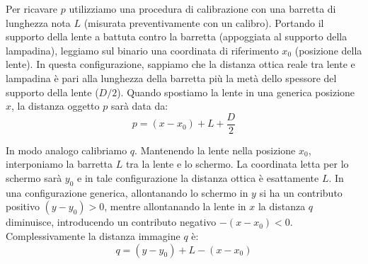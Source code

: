 \documentclass[openany,a4paper,12pt]{book}
\begin{document}
Per ricavare $p$ utilizziamo una procedura di calibrazione con una barretta di lunghezza nota $L$ (misurata preventivamente con un calibro). Portando il supporto della lente a battuta contro la barretta (appoggiata al supporto della lampadina), leggiamo sul binario una coordinata di riferimento $x_0$ (posizione della lente). In questa configurazione, sappiamo che la distanza ottica reale tra lente e lampadina è pari alla lunghezza della barretta più la metà dello spessore del supporto della lente ($D/2$). Quando spostiamo la lente in una generica posizione $x$, la distanza oggetto $p$ sarà data da:
\begin{equation}
    p = (x - x_0) + L + \frac{D}{2}
\end{equation}

In modo analogo calibriamo $q$. Mantenendo la lente nella posizione $x_0$, interponiamo la barretta $L$ tra la lente e lo schermo. La coordinata letta per lo schermo sarà $y_0$ e in tale configurazione la distanza ottica è esattamente $L$. In una configurazione generica, allontanando lo schermo in $y$ si ha un contributo positivo $(y - y_0)>0$, mentre allontanando la lente in $x$ la distanza $q$ diminuisce, introducendo un contributo negativo $-(x - x_0)<0$. Complessivamente la distanza immagine $q$ è:
\begin{equation}
    q = (y - y_0) + L - (x - x_0)
\end{equation}
\end{document}
